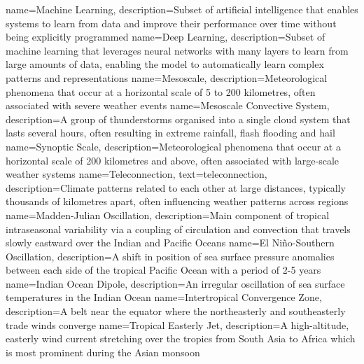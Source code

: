 {
    name=Machine Learning,
    description={Subset of artificial intelligence that enables systems to learn from data and improve their performance over time without being explicitly programmed}
}
{
    name=Deep Learning,
    description={Subset of machine learning that leverages neural networks with many layers to learn from large amounts of data, enabling the model to automatically learn complex patterns and representations}
}
{
    name=Mesoscale,
    description={Meteorological phenomena that occur at a horizontal scale of 5 to 200 kilometres, often associated with severe weather events}
}
{
    name=Mesoscale Convective System,
    description={A group of thunderstorms organised into a single cloud system that lasts several hours, often resulting in extreme rainfall, flash flooding and hail}
}
{
    name=Synoptic Scale,
    description={Meteorological phenomena that occur at a horizontal scale of 200 kilometres and above, often associated with large-scale weather systems}
}
{
    name=Teleconnection,
    text={teleconnection},
    description={Climate patterns related to each other at large distances, typically thousands of kilometres apart, often influencing weather patterns across regions}
}
{
    name=Madden-Julian Oscillation,
    description={Main component of tropical intraseasonal variability via a coupling of circulation and convection that travels slowly eastward over the Indian and Pacific Oceans}
}
{
    name=El Niño-Southern Oscillation,
    description={A shift in position of sea surface pressure anomalies between each side of the tropical Pacific Ocean with a period of 2-5 years}
}
{
    name=Indian Ocean Dipole,
    description={An irregular oscillation of sea surface temperatures in the Indian Ocean}
}
{
    name=Intertropical Convergence Zone,
    description={A belt near the equator where the northeasterly and southeasterly trade winds converge}
}
{
    name=Tropical Easterly Jet,
    description={A high-altitude, easterly wind current stretching over the tropics from South Asia to Africa which is most prominent during the Asian monsoon}
}

